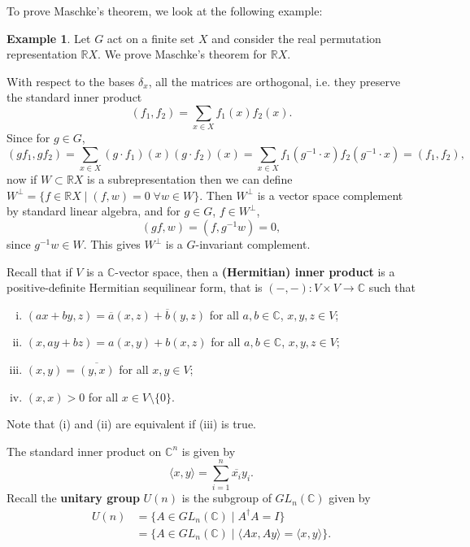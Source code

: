 \documentclass[12pt]{article}
\theoremstyle{definition}
\newtheorem{example}{Example}[section]
\theoremstyle{remark}
\begin{document}
To prove Maschke's theorem, we look at the following example:
\begin{example}
	Let $G$ act on a finite set $X$ and consider the real permutation representation $\mathbb{R}X$. We prove Maschke's theorem for $\mathbb{R}X$.

	With respect to the bases $\delta_{x}$, all the matrices are orthogonal, i.e. they preserve the standard inner product
	\[
		(f_1, f_2) = \sum_{x \in X}f_1(x) f_2(x)
	.\]
	Since for $g \in G$,
	\[
		(gf_1, gf_2) = \sum_{x \in X}(g \cdot f_1)(x) (g \cdot f_2) (x) = \sum_{x \in X} f_1(g^{-1} \cdot x) f_2 (g^{-1} \cdot x) = (f_1, f_2)
	,\]
	now if $W \subset \mathbb{R}X$ is a subrepresentation then we can define $W^{\perp} = \{f \in \mathbb{R}X \mid (f, w) = 0\; \forall w \in W \}$. Then $W^{\perp}$ is a vector space complement by standard linear algebra, and for $g \in G$, $f \in W^{\perp}$,
	\[
		(gf, w) = (f, g^{-1}w) = 0
	,\]
	since $g^{-1}w \in W$. This gives $W^{\perp}$ is a $G$-invariant complement.
\end{example}

Recall that if $V$ is a $\mathbb{C}$-vector space, then a \textbf{(Hermitian) inner product} is a positive-definite Hermitian sequilinear form, that is $(-,-) : V \times V \to \mathbb{C}$ such that
\begin{enumerate}[(i)]
	\item $(ax + by, z) = \overline{a}(x, z) + \overline{b}(y, z)$ for all $a, b \in \mathbb{C}$, $x, y, z \in V$;
	\item $(x, ay + bz) = a(x, y) + b(x, z)$ for all $a, b \in \mathbb{C}$, $x, y, z \in V$;
	\item $(x, y) = \overline{(y, x)}$ for all $x, y \in V$;
	\item $(x, x) > 0$ for all $x \in V \setminus \{0\}$.
\end{enumerate}
Note that (i) and (ii) are equivalent if (iii) is true.

The standard inner product on $\mathbb{C}^{n}$ is given by
\[
	\langle x, y \rangle = \sum_{i = 1}^{n} \overline{x_i}y_i
.\]
Recall the \textbf{unitary group} $U(n)$ is the subgroup of $GL_n(\mathbb{C})$ given by
\begin{align*}
	U(n) &= \{A \in GL_n(\mathbb{C}) \mid A^{\dagger}A = I \} \\
	     &= \{A \in GL_n(\mathbb{C}) \mid \langle Ax, Ay \rangle = \langle x, y\rangle \}.
\end{align*}
\end{document}

